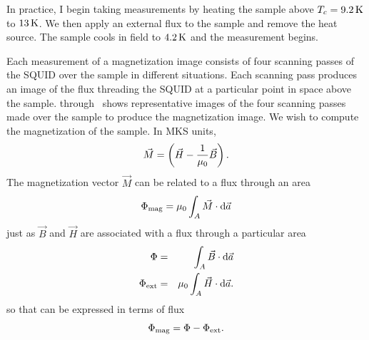 \ifthenelse{\isodd{\value{page}}}{\figthreefour}{\afterpage{\figthreefour}}

In practice, I begin taking measurements by
heating the sample above $T_c = 9.2\,\kelvin$
to $13\,\kelvin$. We then apply an external flux to the sample and remove
the heat source. The sample cools in field to $4.2\,\kelvin$ and the
measurement begins. 

Each measurement of a magnetization image 
consists of four scanning passes of the SQUID over the sample
in different situations.
Each scanning pass produces an image of the flux threading the SQUID at a 
particular point in space above the sample. 
 through 
\ shows 
representative images of the four scanning passes made over the sample
to produce the magnetization image. 
We wish to compute the magnetization of the sample. In MKS units,
\begin{equation}
\vec{M}=\left( \vec{H}-{1 \over \mu_0} \vec{B} \right)\mathrm{.}
\label{eqn:magnetization_defn}
\end{equation}
The magnetization vector $\vec{M}$
can be related to a flux through an area
\begin{equation}
\Phimag = \mu_0 \int_A \vec{M}\cdot \dif \vec{a}
\end{equation}
just as $\vec{B}$ and $\vec{H}$ are associated with a flux through a 
particular area
\begin{eqnarray}
\Phitot & = & \int_A \vec{B}\cdot \dif \vec{a} \\
\Phiext & = & \mu_0 \int_A \vec{H}\cdot \dif \vec{a} \mathrm{.}
\end{eqnarray}
so that  can be expressed in terms of 
flux
\begin{equation}
\Phimag = \Phitot - \Phiext \mathrm{.}
\label{eqn:magnetization_flux_defn}
\end{equation}


%
%



